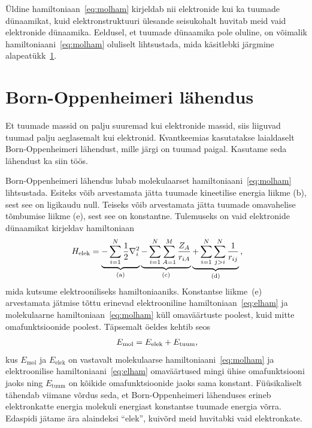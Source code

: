 \documentclass[12pt]{report}
\begin{document}
Üldine hamiltoniaan~\eqref{eq:molham} kirjeldab nii elektronide kui ka tuumade dünaamikat, kuid elektronstruktuuri ülesande seisukohalt huvitab meid vaid elektronide dünaamika.
Eeldusel, et tuumade dünaamika pole oluline, on võimalik hamiltoniaani~\eqref{eq:molham} oluliselt lihtsustada, mida käsitlebki järgmine alapeatükk~\ref{sec:bornopen}.

\section{Born-Oppenheimeri lähendus}\label{sec:bornopen}

Et tuumade massid on palju suuremad kui elektronide massid, siis liiguvad tuumad palju aeglasemalt kui elektronid.
Kvantkeemias kasutatakse laialdaselt Born-Oppenheimeri lähendust, mille järgi on tuumad paigal.
Kasutame seda lähendust ka siin töös.

Born-Oppenheimeri lähendus lubab molekulaarset hamiltoniaani~\eqref{eq:molham} lihtsustada.
Esiteks võib arvestamata jätta tuumade kineetilise energia liikme (b), sest see on ligikaudu null.
Teiseks võib arvestamata jätta tuumade omavahelise tõmbumise liikme (e), sest see on konstantne.
Tulemuseks on vaid elektronide dünaamikat kirjeldav hamiltoniaan
\begin{align}\label{eq:elham}
    H_\text{elek} =
    \underbrace{- \sum_{i = 1}^N \frac{1}{2} \nabla_i^2}_\text{(a)}
    \underbrace{- \sum_{i = 1}^N \sum_{A = 1}^M \frac{Z_A}{r_{iA}}}_\text{(c)}
    \underbrace{+ \sum_{i = 1}^N \sum_{j > i}^N \frac{1}{r_{ij}}}_\text{(d)} \rlap{,}
\end{align}
mida kutsume elektrooniliseks hamiltoniaaniks.
Konstantse liikme~(e) arvestamata jätmise tõttu erinevad elektrooniline hamiltoniaan~\eqref{eq:elham} ja molekulaarne hamiltoniaan~\eqref{eq:molham} küll omaväärtuste poolest, kuid mitte omafunktsioonide poolest.
Täpsemalt öeldes kehtib seos
\begin{align}\label{eq:eigenelvsmol}
    E_\text{mol} = E_\text{elek} + E_\text{tuum} \rlap{,}
\end{align}
kus \(E_\text{mol}\) ja \(E_\text{elek}\) on vastavalt molekulaarse hamiltoniaani~\eqref{eq:molham} ja elektroonilise hamiltoniaani~\eqref{eq:elham} omaväärtused mingi ühise omafunktsiooni jaoks	 ning \(E_\text{tuum}\) on kõikide omafunktsioonide jaoks sama konstant.
Füüsikaliselt tähendab viimane võrdus seda, et Born-Oppenheimeri lähenduses erineb elektronkatte energia molekuli energiast konstantse tuumade energia võrra.
Edaspidi jätame ära alaindeksi ``elek'', kuivõrd meid huvitabki vaid elektronkate.
\end{document}
